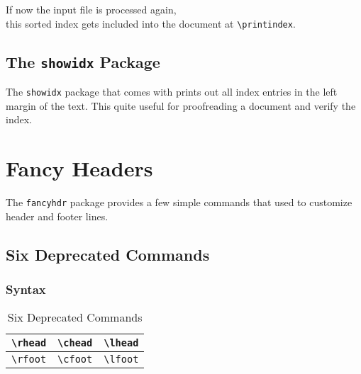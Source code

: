 \documentclass[a4paper]{article}
\begin{document}
\rule{0em}{2ex}

If now the input file is processed again,\\
this sorted index gets included into the document at \verb|\printindex|.

\rule{0em}{2ex}


\newpage
\subsection{The \texttt{showidx} Package}
The \verb|showidx| package that comes with \LaTeXe{} prints out all index entries
in the left margin of the text. This quite useful for proofreading a document and verify the index.

\rule{0em}{0.5pt}


\newpage
\section{Fancy Headers}
The \verb|fancyhdr| package provides a few simple commands that used to customize header and footer lines.

\subsection*{Six Deprecated Commands}
\subsubsection*{Syntax}

\rule{0em}{2ex}

\begin{table}[!ht]
{\renewcommand{\arraystretch}{1.5}
\renewcommand{\tabcolsep}{6pt}
\begin{center}
\caption{Six Deprecated Commands}
\begin{tabular}[c]{lcr}
\hline
\texttt{\textbackslash{}rhead}  &   \texttt{\textbackslash{}chead}  &   \texttt{\textbackslash{}lhead}\\
\hline
\texttt{\textbackslash{}rfoot}  &   \texttt{\textbackslash{}cfoot}  &   \texttt{\textbackslash{}lfoot}\\
\hline
\end{tabular}
\end{center}}
\end{table}
\end{document}
